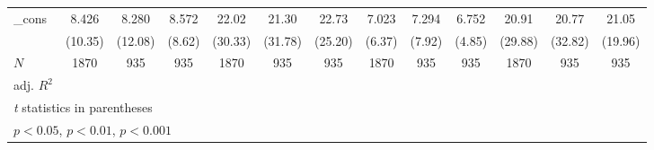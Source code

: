 {\begin{tabular}{l*{12}{c}}
\addlinespace
\_cons      &       8.426\sym{***}&       8.280\sym{***}&       8.572\sym{***}&       22.02\sym{***}&       21.30\sym{***}&       22.73\sym{***}&       7.023\sym{***}&       7.294\sym{***}&       6.752\sym{***}&       20.91\sym{***}&       20.77\sym{***}&       21.05\sym{***}\\
            &     (10.35)         &     (12.08)         &      (8.62)         &     (30.33)         &     (31.78)         &     (25.20)         &      (6.37)         &      (7.92)         &      (4.85)         &     (29.88)         &     (32.82)         &     (19.96)         \\
\midrule
\(N\)       &        1870         &         935         &         935         &        1870         &         935         &         935         &        1870         &         935         &         935         &        1870         &         935         &         935         \\
adj. \(R^{2}\)&                     &                     &                     &                     &                     &                     &                     &                     &                     &                     &                     &                     \\
\bottomrule
\multicolumn{13}{l}{\footnotesize \textit{t} statistics in parentheses}\\
\multicolumn{13}{l}{\footnotesize \sym{*} \(p<0.05\), \sym{**} \(p<0.01\), \sym{***} \(p<0.001\)}\\
\end{tabular}
}
